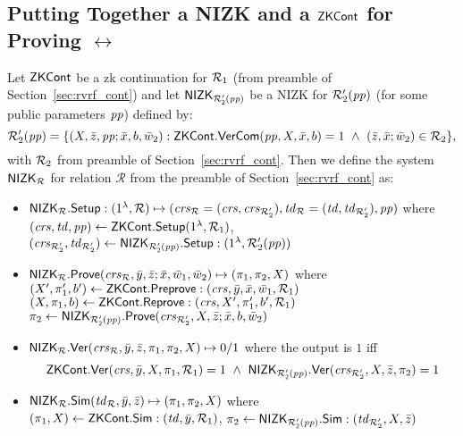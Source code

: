\subsection{Putting Together a NIZK and a $\ZKCont$  for Proving $\rel$}
Let $\ZKCont$ be a zk continuation for $\relone$ (from preamble of Section~\ref{sec:rvrf_cont}) and 
let $\nizktwo$ be a NIZK for $\reltwo'(\pp)$ (for some public parameters $\pp$) defined by:
$$\reltwo'(\pp) = \{(X, \barz, \pp; \barx, b, \baromega_2): \ZKCont.\VerifyCom(\pp, X, \barx, b) =1 \ \wedge \ (\barz, \barx; \baromega_2) \in \reltwo \},$$
\noindent with $\reltwo$ from preamble of Section~\ref{sec:rvrf_cont}. Then we define the system $\nizkR$ for relation $\mathcal{R}$ 
from the preamble of Section~\ref{sec:rvrf_cont} as:
\begin{itemize}
\item $\nizkR.\Setup: (1^{\lambda},\mathcal{R}) \mapsto (\crsR = (\crs,\crstwo), \twR = (\tw, \twtwo), \pp)$ where \\
$(\crs, \tw, \pp) \leftarrow \ZKCont.\Setup(1^{\lambda}, \relone)$, \\ $(\crstwo, \twtwo) \leftarrow \nizktwo.\Setup: (1^{\lambda}, \reltwo'(\pp))$


\item $\nizkR.\Prove(\crsR,\bary, \barz; \barx, \baromega_1, \baromega_2 ) \mapsto (\pi_1, \pi_2, X)$ where \\
$(X', \pi'_1, b')\leftarrow \ZKCont.\Preprove:(\crs, \bar{y}, \bar{x}, \baromega_1, \relone)$ \\
$(X, \pi_1, b) \leftarrow \ZKCont.\Reprove: (\crs, X', \pi_1', b', \relone)$ \\
$ \pi_2 \leftarrow \nizktwo.\Prove(\crstwo, X, \barz; \barx, b, \baromega_2)$ 

\item $\nizkR.\Verify(\crsR,\bary, \barz, \pi_1, \pi_2, X) \mapsto 0/1$ where the output is $1$ iff 
$$\ZKCont.\Verify(\crs, \bar{y}, X, \pi_1, \relone) = 1 \  \wedge \ \nizktwo.\Verify(\crstwo, X, \barz, \pi_2) =1$$

\item $\nizkR.\Sim(\twR, \bary, \barz) \mapsto (\pi_1, \pi_2, X)$ where \\
$(\pi_1, X) \leftarrow \ZKCont.\Sim: (\tw, \bary, \relone)$, $\pi_2 \leftarrow \nizktwo.\Sim: (\twtwo, X, \barz)$ 
 \end{itemize}
 
